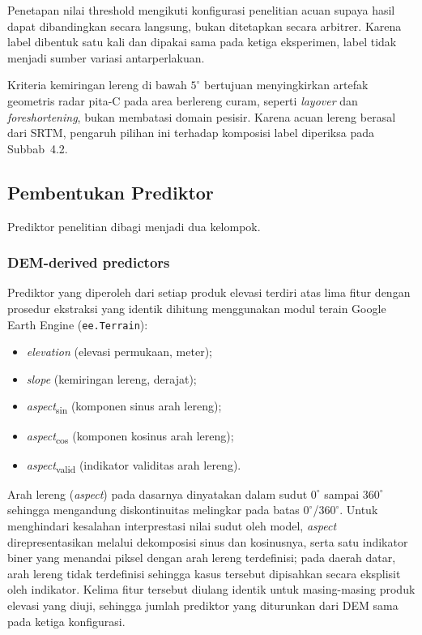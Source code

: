 \documentclass[12pt]{article}
\begin{document}
Penetapan nilai threshold mengikuti konfigurasi penelitian acuan
\cite{hakim2026} supaya hasil dapat dibandingkan secara langsung, bukan
ditetapkan secara arbitrer. Karena label dibentuk satu kali dan dipakai
sama pada ketiga eksperimen, label tidak menjadi sumber variasi
antarperlakuan.

Kriteria kemiringan lereng di bawah $5^{\circ}$ bertujuan menyingkirkan
artefak geometris radar pita-C pada area berlereng curam, seperti
\textit{layover} dan \textit{foreshortening}, bukan membatasi domain pesisir.
Karena acuan lereng berasal dari SRTM, pengaruh pilihan ini terhadap
komposisi label diperiksa pada Subbab~4.2.

\subsection{Pembentukan Prediktor}

Prediktor penelitian dibagi menjadi dua kelompok.

\subsubsection{DEM-derived predictors}

Prediktor yang diperoleh dari setiap produk elevasi terdiri atas lima fitur
dengan prosedur ekstraksi yang identik dihitung menggunakan modul terain
Google Earth Engine (\texttt{ee.Terrain}):

\begin{itemize}
\item \textit{elevation} (elevasi permukaan, meter);
\item \textit{slope} (kemiringan lereng, derajat);
\item \textit{aspect}\textsubscript{sin} (komponen sinus arah lereng);
\item \textit{aspect}\textsubscript{cos} (komponen kosinus arah lereng);
\item \textit{aspect}\textsubscript{valid} (indikator validitas arah lereng).
\end{itemize}

Arah lereng (\textit{aspect}) pada dasarnya dinyatakan dalam sudut $0^{\circ}$
sampai $360^{\circ}$ sehingga mengandung diskontinuitas melingkar pada batas
$0^{\circ}$/$360^{\circ}$. Untuk menghindari kesalahan interprestasi nilai
sudut oleh model, \textit{aspect} direpresentasikan melalui dekomposisi
sinus dan kosinusnya, serta satu indikator biner yang menandai piksel dengan
arah lereng terdefinisi; pada daerah datar, arah lereng tidak terdefinisi
sehingga kasus tersebut dipisahkan secara eksplisit oleh indikator. Kelima fitur tersebut
diulang identik untuk masing-masing produk elevasi yang diuji, sehingga jumlah
prediktor yang diturunkan dari DEM sama pada ketiga konfigurasi.
\end{document}
